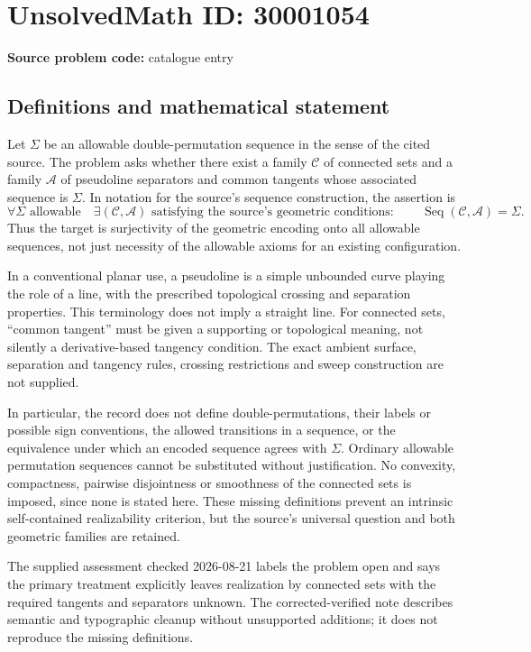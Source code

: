\documentclass[11pt]{article}
\begin{document}
\section*{UnsolvedMath ID: 30001054}
\textbf{Source problem code:} catalogue entry
\subsection{Definitions and mathematical statement}
Let $\Sigma$ be an allowable double-permutation sequence in the sense of the cited source. The problem asks whether there exist a family $\mathcal C$ of connected sets and a family $\mathcal A$ of pseudoline separators and common tangents whose associated sequence is $\Sigma$. In notation for the source's sequence construction, the assertion is
\[
\forall\Sigma\text{ allowable}\quad
\exists(\mathcal C,\mathcal A)\text{ satisfying the source's geometric conditions}:\qquad
\operatorname{Seq}(\mathcal C,\mathcal A)=\Sigma.
\]
Thus the target is surjectivity of the geometric encoding onto all allowable sequences, not just necessity of the allowable axioms for an existing configuration.

In a conventional planar use, a pseudoline is a simple unbounded curve playing the role of a line, with the prescribed topological crossing and separation properties. This terminology does not imply a straight line. For connected sets, ``common tangent'' must be given a supporting or topological meaning, not silently a derivative-based tangency condition. The exact ambient surface, separation and tangency rules, crossing restrictions and sweep construction are not supplied.

In particular, the record does not define double-permutations, their labels or possible sign conventions, the allowed transitions in a sequence, or the equivalence under which an encoded sequence agrees with $\Sigma$. Ordinary allowable permutation sequences cannot be substituted without justification. No convexity, compactness, pairwise disjointness or smoothness of the connected sets is imposed, since none is stated here. These missing definitions prevent an intrinsic self-contained realizability criterion, but the source's universal question and both geometric families are retained.

The supplied assessment checked 2026-08-21 labels the problem open and says the primary treatment explicitly leaves realization by connected sets with the required tangents and separators unknown. The corrected-verified note describes semantic and typographic cleanup without unsupported additions; it does not reproduce the missing definitions.
\end{document}
